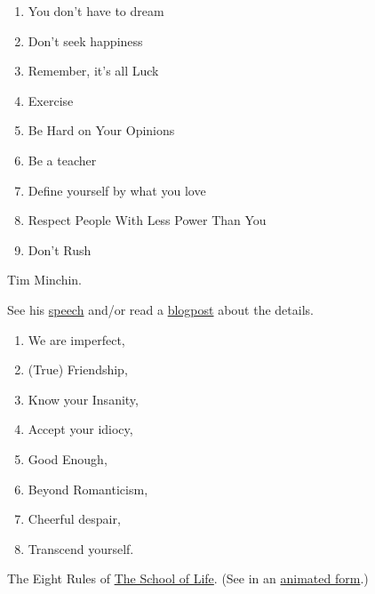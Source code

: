 \documentclass{article}
\begin{document}
\begin{minipage}[t]{0.45\textwidth}

\begin{enumerate}
    \item You don’t have to dream
    \item Don’t seek happiness
    \item Remember, it’s all Luck
    \item Exercise
    \item Be Hard on Your Opinions
    \item Be a teacher
    \item Define yourself by what you love
    \item Respect People With Less Power Than You
    \item Don’t Rush
\end{enumerate}
Tim Minchin.

See his \href{https://www.youtube.com/watch?v=yoEezZD71sc}{speech} and/or read a \href{https://medium.com/speak-louder/9-lessons-on-life-from-tim-minchin-822ab14d92df
}{blogpost} about the details. 

\end{minipage}
\hfill
\begin{minipage}[t]{0.45\textwidth}

\begin{enumerate}
    \item We are imperfect, 
    \item (True) Friendship, 
    \item Know your Insanity, 
    \item Accept your idiocy, 
    \item Good Enough, 
    \item Beyond Romanticism, 
    \item Cheerful despair,  
    \item Transcend yourself.
\end{enumerate}

The Eight Rules of \href{https://en.wikipedia.org/wiki/The_School_of_Life}{The School of Life}.
(See in an \href{https://www.youtube.com/watch?v=1JCJVaK48RM}{animated form}.)

\end{minipage}
\end{document}
